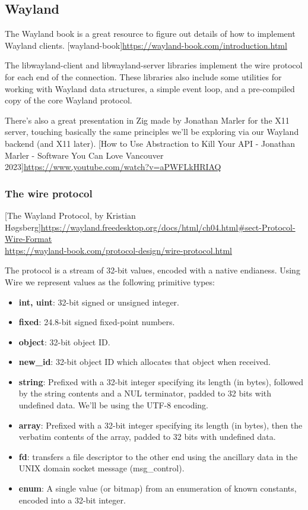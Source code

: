 \subsection{Wayland}
The Wayland book is a great resource to figure out details of how to implement Wayland clients.
[wayland-book]\url{https://wayland-book.com/introduction.html}

The libwayland-client and libwayland-server libraries implement the wire protocol for each end of the connection.
These libraries also include some utilities for working with Wayland data structures, a simple event loop, and a pre-compiled copy of the core Wayland protocol.

There's also a great presentation in Zig made by Jonathan Marler for the X11 server, touching basically the same principles we'll be exploring via our Wayland backend (and X11 later).
[How to Use Abstraction to Kill Your API - Jonathan Marler - Software You Can Love Vancouver 2023]\url{https://www.youtube.com/watch?v=aPWFLkHRIAQ}

\subsubsection{The wire protocol}
[The Wayland Protocol, by Kristian Høgsberg]\url{https://wayland.freedesktop.org/docs/html/ch04.html#sect-Protocol-Wire-Format} \\
[The Wayland Protocol, by Drew DeVault]\url{https://wayland-book.com/protocol-design/wire-protocol.html}

The protocol is a stream of 32-bit values, encoded with a native endianess.
Using Wire we represent values as the following primitive types:
\begin{itemize}
    \item \textbf{int, uint}: 32-bit signed or unsigned integer.
    \item \textbf{fixed}: 24.8-bit signed fixed-point numbers.
    \item \textbf{object}: 32-bit object ID.
    \item \textbf{new\_id}: 32-bit object ID which allocates that object when received.
    \item \textbf{string}: Prefixed with a 32-bit integer specifying its length (in bytes),
        followed by the string contents and a NUL terminator, padded to 32 bits with undefined data.
        We'll be using the UTF-8 encoding.
    \item \textbf{array}: Prefixed with a 32-bit integer specifying its length (in bytes),
        then the verbatim contents of the array, padded to 32 bits with undefined data.
    \item \textbf{fd}: transfers a file descriptor to the other end using the ancillary data 
        in the UNIX domain socket message (msg\_control).
    \item \textbf{enum}: A single value (or bitmap) from an enumeration of known constants, encoded into a 32-bit integer.
\end{itemize}

